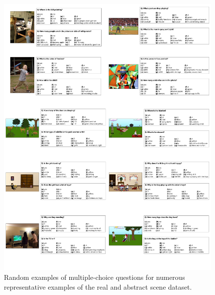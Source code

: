 \begin{figure}[t]
\centering
\includegraphics[width=1\linewidth]{figures/MC_examples_compressed.pdf}
\caption{Random examples of multiple-choice questions for numerous representative examples of the real and abstract scene dataset.}
\label{fig:mc_examples}
\end{figure}